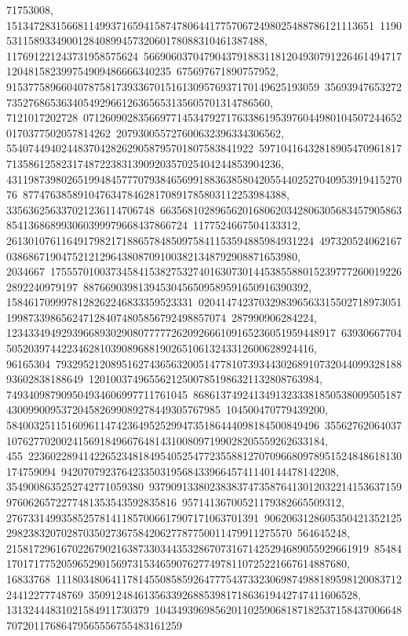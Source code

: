 {{{71753008, 1513472831566811499371659415874780644177570672498025488786121113651\
119053115893349001284089945732060178088310461387488, 117691221243731958575624\
56690603704790437918831181204930791226461494717120481582399754909486666340235\
675697671890757952, 915377589660407875817393367015161309576937170149625193059\
35693947653272735276865363405492966126365653135605701314786560, 7121017202728\
07126090283566977145347927176338619539760449801045072446520170377502057814262\
207930055727600632396334306562, 554074494024483704282629058795701807583841922\
5971041643281890547096181771358612582317487223831390920357025404244853904236, 
   43119873980265199484577707938465699188363858042055440252704095391941527076\
877476385891047634784628170891785803112253984388, 335636256337021236114706748\
66356810289656201680620342806305683457905863854136868993060399979668437866724\
1177524667504133312, 26130107611649179821718865784850975841153594885984931224\
49732052406216703868671904752121296438087091003821348792908871653980, 2034667\
17555701003734584153827532740163073014453855880152397772600192262892240979197\
88766903981394530456509589591650916390392, 1584617099978128262246833359523331\
02041474237032983965633155027189730511998733986562471284074805856792498857074\
287990906284224, 123433494929396689302908077777262092666109165236051959448917\
6393066770450520397442234628103908968819026510613243312600628924416, 96165304\
79329521208951627436563200514778107393443026891073204409932818893602838188649\
120100374965562125007851986321132808763984, 749340987909504934606997711761045\
86861374924134913233381850538009505187430099009537204582699089278449305767985\
104500470779439200, 584003251151609611474236495252994735186444098184500849496\
355627620640371076277020024156918496676481431008097199028205559262633184, 455\
22360228941422652348184954052547723558812707096680978951524848618130174759094\
94207079237642335031956843396645741140144478142208, 3549008635252742771059380\
93790913380238383747358764130120322141536371599760626572277481353543592835816\
95714136700521179382665509312, 2767331499358525781411857006617907171063701391\
90620631286053504213521252982383207028703502736758420627787750011479911275570\
564645248, 215817296167022679021638733034435328670731671425294689055929661919\
8548417017177520596529015697315346590762774978110725221667614887680, 16833768\
11180348064117814550858592647775437332306987498818959812008371224412277748769\
3509124846135633926885398171863619442747411606528, 13132444831021584911730379\
10434939698562011025906818718253715843700664870720117686479565556755483161259\
}}}
